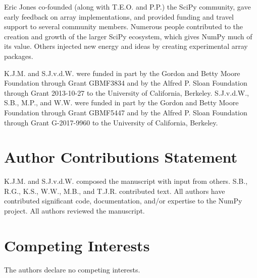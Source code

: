 \documentclass[fleqn,10pt,twocolumn]{wlscirep}
\begin{document}
Eric Jones co-founded (along with T.E.O. and P.P.) the SciPy community, gave early feedback on array
implementations, and provided funding and travel support to several
community members.
Numerous people contributed to the creation and
growth of the larger SciPy ecosystem, which gives NumPy much of its
value. Others injected new energy and ideas by creating experimental
array packages.

K.J.M. and S.J.v.d.W. were funded in part by the Gordon and Betty Moore
Foundation through Grant GBMF3834 and by the Alfred P. Sloan Foundation through
Grant 2013-10-27 to the University of California, Berkeley.
S.J.v.d.W., S.B., M.P., and W.W. were funded in part by the Gordon
and Betty Moore Foundation through Grant GBMF5447 and by the Alfred
P. Sloan Foundation through Grant G-2017-9960 to the University of
California, Berkeley.

\section*{Author Contributions Statement}

K.J.M. and S.J.v.d.W. composed the manuscript with input from others.
S.B., R.G., K.S., W.W., M.B., and T.J.R. contributed text.
All authors have contributed significant code, documentation, and/or expertise
to the NumPy project.
All authors reviewed the manuscript.

\section*{Competing Interests}

The authors declare no competing interests.
\end{document}
